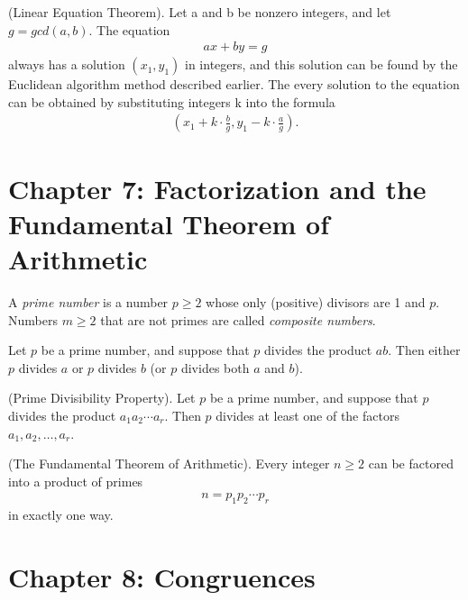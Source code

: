 \documentclass[graybox]{svmult}
\begin{document}
\begin{theorem}
(Linear Equation Theorem). Let a and b be nonzero integers, and let $g=gcd(a,b)$. The equation
\begin{align*}
ax+by=g
\end{align*}
always has a solution $(x_1, y_1)$ in integers, and this solution can be found by the Euclidean algorithm method described earlier. The every solution to the equation can be obtained by substituting integers k into the formula
\begin{align*}
\left(x_1+k\cdot\frac{b}{g}, y_1-k\cdot\frac{a}{g}\right).
\end{align*}
\end{theorem}

\section*{Chapter 7: Factorization and the Fundamental Theorem of Arithmetic}

\begin{definition}
A \textit{prime number} is a number $p \geqslant 2$ whose only (positive) divisors are 1 and $p$. Numbers $m \geqslant 2$ that are not primes are called \textit{composite numbers}.
\end{definition}

\begin{lemma}
Let $p$ be a prime number, and suppose that $p$ divides the product $ab$. Then either $p$ divides $a$ or $p$ divides $b$ (or $p$ divides both $a$ and $b$).
\end{lemma}

\begin{theorem}
(Prime Divisibility Property). Let $p$ be a prime number, and suppose that $p$ divides the product $a_1a_2\cdots a_r$. Then $p$ divides at least one of the factors $a_1, a_2, \ldots, a_r$.
\end{theorem}

\begin{theorem}
(The Fundamental Theorem of Arithmetic). Every integer $n \geqslant 2$ can be factored into a product of primes
\begin{align*}
n=p_1p_2\cdots p_r
\end{align*}
in exactly one way.
\end{theorem}

\section*{Chapter 8: Congruences}
\end{document}
